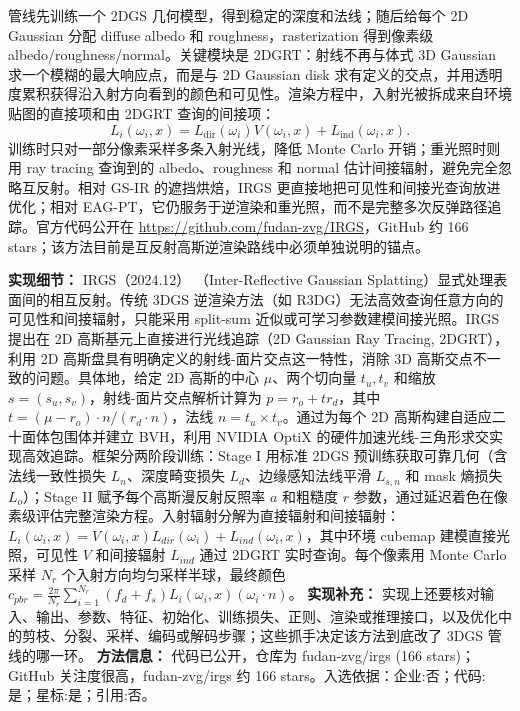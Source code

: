 管线先训练一个 2DGS 几何模型，得到稳定的深度和法线；随后给每个 2D Gaussian 分配 diffuse albedo 和 roughness，rasterization 得到像素级 albedo/roughness/normal。关键模块是 2DGRT：射线不再与体式 3D Gaussian 求一个模糊的最大响应点，而是与 2D Gaussian disk 求有定义的交点，并用透明度累积获得沿入射方向看到的颜色和可见性。渲染方程中，入射光被拆成来自环境贴图的直接项和由 2DGRT 查询的间接项：
\[
  L_i(\omega_i,x)=L_{\mathrm{dir}}(\omega_i)V(\omega_i,x)+L_{\mathrm{ind}}(\omega_i,x).
\]
训练时只对一部分像素采样多条入射光线，降低 Monte Carlo 开销；重光照时则用 ray tracing 查询到的 albedo、roughness 和 normal 估计间接辐射，避免完全忽略互反射。相对 GS-IR 的遮挡烘焙，IRGS 更直接地把可见性和间接光查询放进优化；相对 EAG-PT，它仍服务于逆渲染和重光照，而不是完整多次反弹路径追踪。官方代码公开在 \url{https://github.com/fudan-zvg/IRGS}，GitHub 约 166 stars；该方法目前是互反射高斯逆渲染路线中必须单独说明的锚点。

\textbf{实现细节：} IRGS（2024.12） （Inter-Reflective Gaussian Splatting）显式处理表面间的相互反射。传统 3DGS 逆渲染方法（如 R3DG）无法高效查询任意方向的可见性和间接辐射，只能采用 split-sum 近似或可学习参数建模间接光照。IRGS 提出在 2D 高斯基元上直接进行光线追踪（2D Gaussian Ray Tracing, 2DGRT），利用 2D 高斯盘具有明确定义的射线-面片交点这一特性，消除 3D 高斯交点不一致的问题。具体地，给定 2D 高斯的中心 $\mu$、两个切向量 $t_u, t_v$ 和缩放 $s=(s_u,s_v)$，射线-面片交点解析计算为 $p = r_o + t r_d$，其中 $t = (\mu - r_o) \cdot n / (r_d \cdot n)$，法线 $n = t_u \times t_v$。通过为每个 2D 高斯构建自适应二十面体包围体并建立 BVH，利用 NVIDIA OptiX 的硬件加速光线-三角形求交实现高效追踪。框架分两阶段训练：Stage I 用标准 2DGS 预训练获取可靠几何（含法线一致性损失 $L_n$、深度畸变损失 $L_d$、边缘感知法线平滑 $L_{s,n}$ 和 mask 熵损失 $L_o$）；Stage II 赋予每个高斯漫反射反照率 $a$ 和粗糙度 $r$ 参数，通过延迟着色在像素级评估完整渲染方程。入射辐射分解为直接辐射和间接辐射：$L_i(\omega_i, x) = V(\omega_i, x) L_{dir}(\omega_i) + L_{ind}(\omega_i, x)$，其中环境 cubemap 建模直接光照，可见性 $V$ 和间接辐射 $L_{ind}$ 通过 2DGRT 实时查询。每个像素用 Monte Carlo 采样 $N_r$ 个入射方向均匀采样半球，最终颜色 $c_{pbr} = \frac{2\pi}{N_r}\sum_{i=1}^{N_r}(f_d+f_s) L_i(\omega_i, x)(\omega_i \cdot n)$。
\textbf{实现补充：} 实现上还要核对输入、输出、参数、特征、初始化、训练损失、正则、渲染或推理接口，以及优化中的剪枝、分裂、采样、编码或解码步骤；这些抓手决定该方法到底改了 3DGS 管线的哪一环。
\textbf{方法信息：} 代码已公开，仓库为 fudan-zvg/irgs (166 stars)；GitHub 关注度很高，fudan-zvg/irgs 约 166 stars。入选依据：企业:否；代码:是；星标:是；引用:否。


